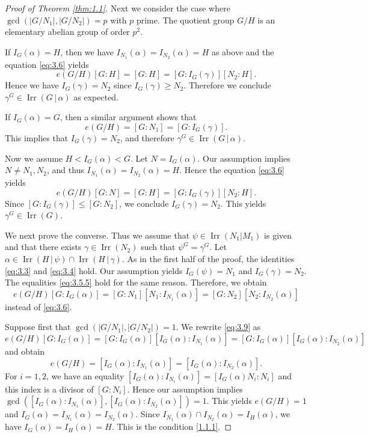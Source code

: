 \documentclass[a4paper,12pt]{article}
\theoremstyle{definition}
\theoremstyle{remark}
\DeclareMathOperator{\irr}{Irr}
\numberwithin{equation}{section}
\begin{document}
\begin{proof}[Proof of Theorem \ref{thm:1.1}]
Next we consider the case where $\gcd (|G/N_1|, |G/N_2|) = p$ with $p$ prime.
The quotient group $G/H$ is an elementary abelian group of order $p^2$.

If $I_G (\alpha) =H$, then we have $I_{N_1} (\alpha ) = I_{N_2} (\alpha ) = H$ as above
and the equation \eqref{eq:3.6} yields
\[ e (G/H) [G: H ]=  [G: H]= [G: I_G (\gamma)] [N_2 : H].
\]
Hence we have $I_G (\gamma) = N_2$ since $I_G (\gamma) \ge N_2$.
Therefore we conclude $\gamma^G \in \irr (G \,|\, \alpha ) $ as expected.

If $I_G (\alpha) =G$, then a similar argument shows that 
\[
e (G/H) =  [G: N_1]= [G: I_G (\gamma)]. 
\]
This implies that $I_G (\gamma) = N_2$, and therefore $\gamma^G \in \irr (G \,|\, \alpha ) $.

Now we assume $H < I_G (\alpha) < G $. 
Let $N=I_G (\alpha )$. Our assumption implies $N \neq N_1, N_2$, and thus
$I_{N_1} (\alpha ) = I_{N_2} (\alpha ) =H$. Hence the equation \eqref{eq:3.6} yields
\[
e (G/H) [G: N] =  [G: H ]= [G: I_G (\gamma)] [N_2 : H].
\]
Since $[G : I_G (\gamma )] \le [G: N_2]$, we conclude $I_G (\gamma ) =N_2$. 
This yields $\gamma^G \in \irr (G) $. 

We next prove the converse. Thus we assume that $\psi \in \irr (N_1 | M_1)$ is given and that there exists $\gamma \in \irr (N_2)$ such that
$\psi^G= \gamma^G$. Let $\alpha \in \irr (H \,|\, \psi ) \cap \irr (H \,|\, \gamma )$.
As in the first half of the proof, the identities \eqref{eq:3.3} and \eqref{eq:3.4} hold. 
Our assumption yields $I_G (\psi) = N_1$ and $I_G (\gamma )=N_2$.  The equalities \eqref{eq:3.5.5} hold for the same reason.
Therefore, we obtain 
\begin{equation} \label{eq:3.9}
e(G/H) [G: I_G (\alpha )]  = [G : N_1][N_1: I_{N_{1}} (\alpha )] = [G : N_2] [N_2: I_{N_2} (\alpha )]
\end{equation}
instead of \eqref{eq:3.6}. 

 
 
Suppose first that $\gcd ( |G/N_1| , |G/N_2|)=1$. 
We rewrite \eqref{eq:3.9} as
\[
e(G/H) [G: I_G (\alpha )]  = [G : I_G (\alpha ) ][ I_G (\alpha ): I_{N_{1}} (\alpha )] = [G : I_G (\alpha)] [I_G (\alpha ): I_{N_2} (\alpha )]
\]
and obtain 
\begin{equation} \label{eq:3.10}
e(G/H)   = [ I_G (\alpha ): I_{N_{1}} (\alpha )] =  [I_G (\alpha ): I_{N_2} (\alpha )].
\end{equation}
For $i=1,2$, we have an equality $ [ I_G (\alpha ): I_{N_{i}} (\alpha )] = [I_G (\alpha ) N_i : N_i] $ and this index is a divisor 
of $[G:N_i]$. Hence our assumption implies $ \gcd ([ I_G (\alpha ): I_{N_{1}} (\alpha )] , [ I_G (\alpha ): I_{N_{2}} (\alpha )] )=1$.
This yields $e(G/H)=1$ and $I_G (\alpha) = I_{N_1} (\alpha ) = I_{N_2} (\alpha)$.
Since $I_{N_1} (\alpha ) \cap I_{N_2} (\alpha) = I_{H} (\alpha)$, we have $I_G (\alpha) = I_H (\alpha ) =H$. This is the condition \ref{1.1.1}.


\end{proof}
\end{document}
